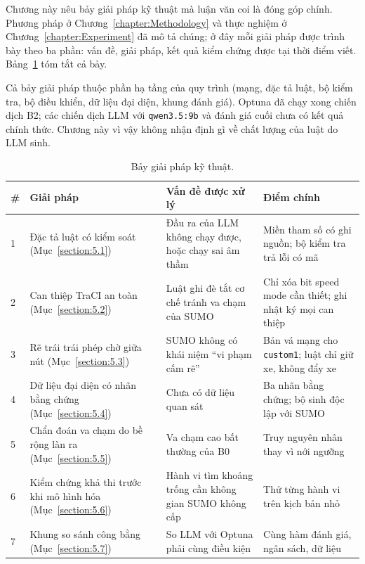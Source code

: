 \documentclass[../DoAn.tex]{subfiles}
\begin{document}

Chương này nêu bảy giải pháp kỹ thuật mà luận văn coi là đóng góp chính. Phương pháp ở Chương~\ref{chapter:Methodology} và thực nghiệm ở Chương~\ref{chapter:Experiment} đã mô tả chúng; ở đây mỗi giải pháp được trình bày theo ba phần: vấn đề, giải pháp, kết quả kiểm chứng được tại thời điểm viết. Bảng~\ref{table:5.0} tóm tắt cả bảy.

Cả bảy giải pháp thuộc phần hạ tầng của quy trình (mạng, đặc tả luật, bộ kiểm tra, bộ điều khiển, dữ liệu đại diện, khung đánh giá). Optuna đã chạy xong chiến dịch B2; các chiến dịch LLM với \texttt{qwen3.5:9b} và đánh giá cuối chưa có kết quả chính thức. Chương này vì vậy không nhận định gì về chất lượng của luật do LLM sinh.

\begin{table}[ht]
\centering
\small
\caption{Bảy giải pháp kỹ thuật.}
\label{table:5.0}
\begin{tabular}{|p{0.6cm}|p{3.6cm}|p{4.6cm}|p{5.2cm}|}
\hline
\textbf{\#} & \textbf{Giải pháp} & \textbf{Vấn đề được xử lý} & \textbf{Điểm chính} \\ \hline
1 & Đặc tả luật có kiểm soát (Mục~\ref{section:5.1}) & Đầu ra của LLM không chạy được, hoặc chạy sai âm thầm & Miền tham số có ghi nguồn; bộ kiểm tra trả lỗi có mã \\ \hline
2 & Can thiệp TraCI an toàn (Mục~\ref{section:5.2}) & Luật ghi đè tắt cơ chế tránh va chạm của SUMO & Chỉ xóa bit speed mode cần thiết; ghi nhật ký mọi can thiệp \\ \hline
3 & Rẽ trái trái phép chờ giữa nút (Mục~\ref{section:5.3}) & SUMO không có khái niệm ``vi phạm cấm rẽ'' & Bản vá mạng cho \texttt{custom1}; luật chỉ giữ xe, không đẩy xe \\ \hline
4 & Dữ liệu đại diện có nhãn bằng chứng (Mục~\ref{section:5.4}) & Chưa có dữ liệu quan sát & Ba nhãn bằng chứng; bộ sinh độc lập với SUMO \\ \hline
5 & Chẩn đoán va chạm do bề rộng làn ra (Mục~\ref{section:5.5}) & Va chạm cao bất thường của B0 & Truy nguyên nhân thay vì nới ngưỡng \\ \hline
6 & Kiểm chứng khả thi trước khi mô hình hóa (Mục~\ref{section:5.6}) & Hành vi tìm khoảng trống cần không gian SUMO không cấp & Thử từng hành vi trên kịch bản nhỏ \\ \hline
7 & Khung so sánh công bằng (Mục~\ref{section:5.7}) & So LLM với Optuna phải cùng điều kiện & Cùng hàm đánh giá, ngân sách, dữ liệu \\ \hline
\end{tabular}
\end{table}
\end{document}
